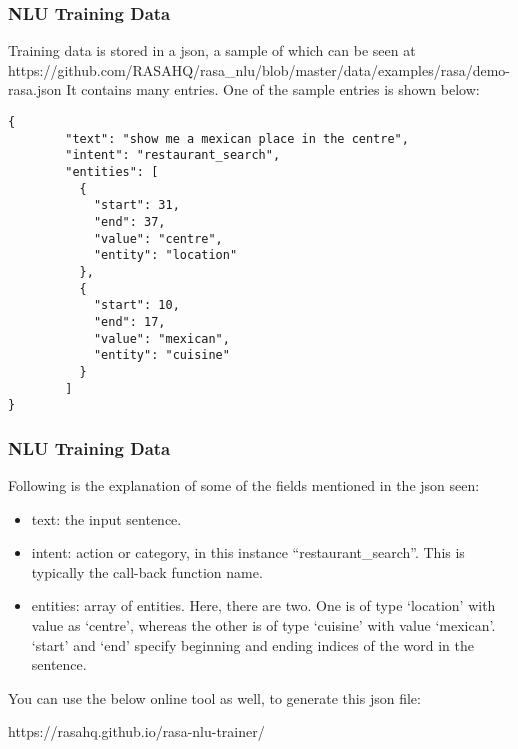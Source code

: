  \begin{frame}[fragile]\frametitle{NLU Training Data}
 
Training data is stored in a json, a sample of which can be seen at https://github.com/RASAHQ/rasa\_nlu/blob/master/data/examples/rasa/demo-rasa.json
It contains many entries. One of the sample entries is shown below:
\begin{lstlisting}
{
        "text": "show me a mexican place in the centre",
        "intent": "restaurant_search",
        "entities": [
          {
            "start": 31,
            "end": 37,
            "value": "centre",
            "entity": "location"
          },
          {
            "start": 10,
            "end": 17,
            "value": "mexican",
            "entity": "cuisine"
          }
        ]
}
\end{lstlisting}

\end{frame}

 \begin{frame}[fragile]\frametitle{NLU Training Data}
 Following is the explanation of some of the fields mentioned in the json seen:
\begin{itemize}
\item text: the input sentence.
\item intent: action or category, in this instance ``restaurant\_search''. This is typically the call-back function name.
\item entities: array of entities. Here, there are two. One is of type `location' with value as `centre', whereas the other is of type `cuisine' with value `mexican'. `start' and `end' specify beginning and ending indices of the word in the sentence.
\end{itemize}
You can use the below online tool as well, to generate this json file:

https://rasahq.github.io/rasa-nlu-trainer/
\end{frame}




